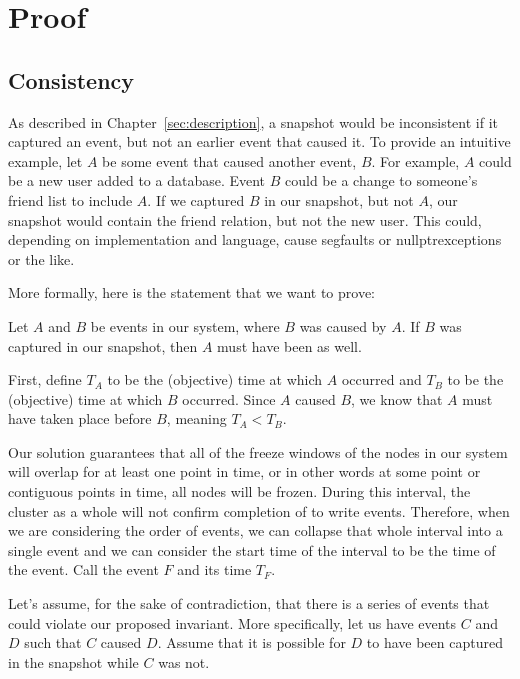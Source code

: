 \chapter{Proof}
\label{sec:proof}


\section{Consistency}

As described in Chapter~\ref{sec:description}, a snapshot would be
inconsistent if it captured an event, but not an earlier event that
caused it. To provide an intuitive example, let $A$ be some event that
caused another event, $B$.  For example, $A$ could be a new user added
to a database. Event $B$ could be a change to someone's friend list to
include $A$. If we captured $B$ in our snapshot, but not $A$, our
snapshot would contain the friend relation, but not the new user. This
could, depending on implementation and language, cause segfaults or
nullptrexceptions or the like.

More formally, here is the statement that we want to prove:

Let $A$ and $B$ be events in our system, where $B$ was caused by
$A$. If $B$ was captured in our snapshot, then $A$ must have been as
well.

First, define $T_A$ to be the (objective) time at which $A$ occurred
and $T_B$ to be the (objective) time at which $B$ occurred. Since $A$
caused $B$, we know that $A$ must have taken place before $B$, meaning
$T_A < T_B$.

Our solution guarantees that all of the freeze windows of the nodes in
our system will overlap for at least one point in time, or in other
words at some point or contiguous points in time, all nodes will be
frozen.  During this interval, the cluster as a whole will not confirm
completion of to write events. Therefore, when we are considering the
order of events, we can collapse that whole interval into a single
event and we can consider the start time of the interval to be the
time of the event. Call the event $F$ and its time $T_F$.

Let's assume, for the sake of contradiction, that there is a series of
events that could violate our proposed invariant. More specifically,
let us have events $C$ and $D$ such that $C$ caused $D$. Assume that
it is possible for $D$ to have been captured in the snapshot while $C$
was not.

